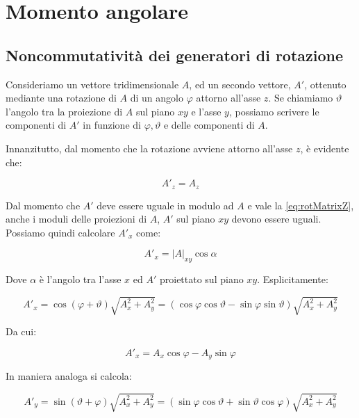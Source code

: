 \section{Momento angolare}

\subsection{Noncommutativit\`a dei generatori di rotazione}

Consideriamo un vettore tridimensionale $A$, ed un secondo vettore, $A'$, ottenuto mediante una rotazione di $A$ di un angolo $\varphi$ attorno all'asse $z$. Se chiamiamo $\vartheta$ l'angolo tra la proiezione di $A$ sul piano $xy$ e l'asse $y$, possiamo scrivere le componenti di $A'$ in funzione di $\varphi, \vartheta$ e delle componenti di $A$.

Innanzitutto, dal momento che la rotazione avviene attorno all'asse $z$, \`e evidente che:

	\begin{equation} \label{eq:rotMatrixZ}
		A'_z = A_z
	\end{equation}

Dal momento che $A'$ deve essere uguale in modulo ad $A$ e vale la \eqref{eq:rotMatrixZ}, anche i moduli delle proiezioni di $A$, $A'$ sul piano $xy$ devono essere uguali. Possiamo quindi calcolare $A'_x$ come:

	\begin{equation}
		A'_x = \left | A \right |_{xy} \cos \alpha
	\end{equation}

Dove $\alpha$ \`e l'angolo tra l'asse $x$ ed $A'$ proiettato sul piano $xy$. Esplicitamente:

	\begin{equation}
		A'_x = \cos(\varphi + \vartheta) \sqrt{A_x^2 + A_y^2} = (\cos \varphi \cos \vartheta - \sin \varphi \sin \vartheta)
			\sqrt{A_x^2 + A_y^2}
	\end{equation}

Da cui:

	\begin{equation} \label{eq:rotMatrixX}
		A'_x = A_x \cos \varphi - A_y \sin \varphi
	\end{equation}

In maniera analoga si calcola:

	\begin{equation}
		A'_y = \sin( \vartheta + \varphi ) \sqrt{A_x^2 + A_y^2} = (\sin \varphi \cos \vartheta + \sin \vartheta \cos \varphi)
			\sqrt{A_x^2 + A_y^2}
	\end{equation}

